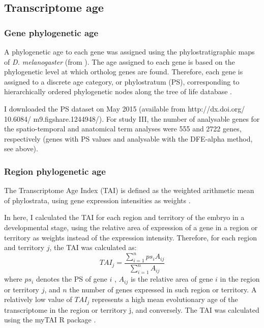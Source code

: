\subsection{Transcriptome age}

\subsubsection{Gene phylogenetic age}
A phylogenetic age to each gene was assigned using the phylostratigraphic maps of \textit{D. melanogaster} (from \citealp{Drost2014}). The age assigned to each gene is based on the phylogenetic level at which ortholog genes are found. 
Therefore, each gene is assigned to a discrete age category, or phylostratum (PS), corresponding to hierarchically ordered phylogenetic nodes along the tree of life database \citep{Drost2015}. 

I downloaded the PS dataset on May 2015 (available from http://dx.doi.org/ 10.6084/ m9.figshare.1244948/). For study III, the number of analysable genes for the spatio-temporal and anatomical term analyses were 555 and 2722 genes, respectively (genes with PS values and analysable with the DFE-alpha method, see above).


\subsubsection{Region phylogenetic age} 

The Transcriptome Age Index (TAI) is defined as the weighted arithmetic mean of phylostrata, using gene expression intensities as weights \citep{Domazet-Loso2010}.

In here, I calculated the TAI for each region and territory of the embryo in a developmental stage, using the relative area of expression of a gene in a region or territory as weights instead of the expression intensity.
Therefore, for each region and territory $j$, the TAI was calculated as:
%
$$ TAI_{j} = \frac{ \sum_{i=1}^{n} ps_{i}A_{ij} }{ \sum_{i=1}^{n} A_{ij} }$$
%
where $ps_{i}$ denotes the PS of gene $i$ , $A_{ij}$ is the relative area of gene $i$ in the region or territory $j$, and $n$ the number of genes expressed in such region or territory. A relatively low value of $TAI_{j}$ represents a high mean evolutionary age of the transcriptome in the region or territory j, and conversely. The TAI was calculated using the myTAI R package \citep{Drost2014}.

